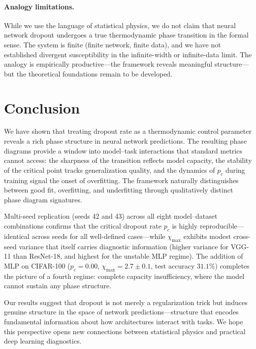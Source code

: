 \documentclass{article}
\begin{document}
\paragraph{Analogy limitations.}
While we use the language of statistical physics, we do not claim that neural network dropout undergoes a true thermodynamic phase transition in the formal sense. The system is finite (finite network, finite data), and we have not established divergent susceptibility in the infinite-width or infinite-data limit. The analogy is empirically productive---the framework reveals meaningful structure---but the theoretical foundations remain to be developed.

\section{Conclusion}
\label{sec:conclusion}

We have shown that treating dropout rate as a thermodynamic control parameter reveals a rich phase structure in neural network predictions. The resulting phase diagrams provide a window into model--task interactions that standard metrics cannot access: the sharpness of the transition reflects model capacity, the stability of the critical point tracks generalization quality, and the dynamics of $p_c$ during training signal the onset of overfitting. The framework naturally distinguishes between good fit, overfitting, and underfitting through qualitatively distinct phase diagram signatures.

Multi-seed replication (seeds 42 and 43) across all eight model--dataset combinations confirms that the critical dropout rate $p_c$ is highly reproducible---identical across seeds for all well-defined cases---while $\chi_{\max}$ exhibits modest cross-seed variance that itself carries diagnostic information (higher variance for VGG-11 than ResNet-18, and highest for the unstable MLP regime). The addition of MLP on CIFAR-100 ($p_c = 0.00$, $\chi_{\max} = 2.7 \pm 0.1$, test accuracy $31.1\%$) completes the picture of a fourth regime: complete capacity insufficiency, where the model cannot sustain any phase structure.

Our results suggest that dropout is not merely a regularization trick but induces genuine structure in the space of network predictions---structure that encodes fundamental information about how architectures interact with tasks. We hope this perspective opens new connections between statistical physics and practical deep learning diagnostics.
\end{document}
